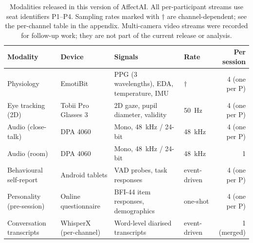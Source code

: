 
\begin{table}[t]
  \centering
  \caption{Modalities released in this version of AffectAI.
    All per-participant streams use seat identifiers P1--P4.
    Sampling rates marked with $\dagger$ are channel-dependent;
    see the per-channel table in the appendix.
    Multi-camera video streams were recorded for follow-up work; they are not part of the current release or analysis.}
  \label{tab:modalities}
  \small
  \begin{tabular}{llllr}
    \toprule
    \textbf{Modality} & \textbf{Device} & \textbf{Signals} & \textbf{Rate} & \textbf{Per session} \\
    \midrule
    Physiology
      & EmotiBit
      & PPG (3 wavelengths), EDA, temperature, IMU
      & $\dagger$
      & 4 (one per P) \\
    \addlinespace
    Eye tracking (2D)
      & Tobii Pro Glasses 3
      & 2D gaze, pupil diameter, validity
      & 50~Hz
      & 4 (one per P) \\
    \addlinespace
    Audio (close-talk)
      & DPA 4060
      & Mono, 48~kHz / 24-bit
      & 48~kHz
      & 4 (one per P) \\
    \addlinespace
    Audio (room)
      & DPA 4060
      & Mono, 48~kHz / 24-bit
      & 48~kHz
      & 1 \\
    \addlinespace
    Behavioural self-report
      & Android tablets
      & VAD probes, task responses
      & event-driven
      & 4 (one per P) \\
    \addlinespace
    Personality (pre-session)
      & Online questionnaire
      & BFI-44 item responses, demographics
      & one-shot
      & 4 (one per P) \\
    \addlinespace
    Conversation transcripts
      & WhisperX (per-channel)
      & Word-level diarised transcripts
      & event-driven
      & 1 (merged) \\
    \bottomrule
  \end{tabular}
\end{table}
